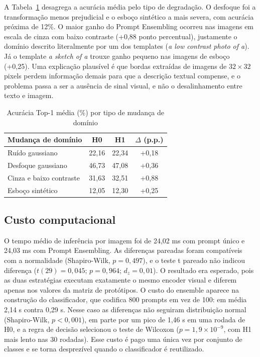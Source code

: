 \documentclass[conference]{IEEEtran}
\begin{document}
A Tabela~\ref{tab:shift} desagrega a acurácia média pelo tipo de degradação. O desfoque foi a transformação menos prejudicial e o esboço sintético a mais severa, com acurácia próxima de 12\%. O maior ganho do Prompt Ensembling ocorreu nas imagens em escala de cinza com baixo contraste (+0,88 ponto percentual), justamente o domínio descrito literalmente por um dos templates (\textit{a low contrast photo of a}). Já o template \textit{a sketch of a} trouxe ganho pequeno nas imagens de esboço (+0,25). Uma explicação plausível é que bordas extraídas de imagens de $32 \times 32$ pixels perdem informação demais para que a descrição textual compense, e o problema passa a ser a ausência de sinal visual, e não o desalinhamento entre texto e imagem.

\begin{table}[!t]
\centering
\caption{Acurácia Top-1 média (\%) por tipo de mudança de domínio}
\label{tab:shift}
\begin{tabular}{lccc}
\toprule
Mudança de domínio & H0 & H1 & $\Delta$ (p.p.) \\
\midrule
Ruído gaussiano & 22,16 & 22,34 & +0,18 \\
Desfoque gaussiano & 46,73 & 47,08 & +0,36 \\
Cinza e baixo contraste & 31,63 & 32,51 & +0,88 \\
Esboço sintético & 12,05 & 12,30 & +0,25 \\
\bottomrule
\end{tabular}
\end{table}

\subsection{Custo computacional}

O tempo médio de inferência por imagem foi de 24,02 ms com prompt único e 24,03 ms com Prompt Ensembling. As diferenças pareadas foram compatíveis com a normalidade (Shapiro-Wilk, $p = 0{,}497$), e o teste t pareado não indicou diferença ($t(29) = 0{,}045$; $p = 0{,}964$; $d_z = 0{,}01$). O resultado era esperado, pois as duas estratégias executam exatamente o mesmo encoder visual e diferem apenas nos valores da matriz de protótipos. O custo do ensemble aparece na construção do classificador, que codifica 800 prompts em vez de 100: em média 2,14 s contra 0,29 s. Nesse caso as diferenças não seguiram distribuição normal (Shapiro-Wilk, $p < 0{,}001$), em parte por um pico de 1,46 s em uma rodada de H0, e a regra de decisão selecionou o teste de Wilcoxon ($p = 1{,}9 \times 10^{-9}$, com H1 mais lento nas 30 rodadas). Esse custo é pago uma única vez por conjunto de classes e se torna desprezível quando o classificador é reutilizado.
\end{document}
